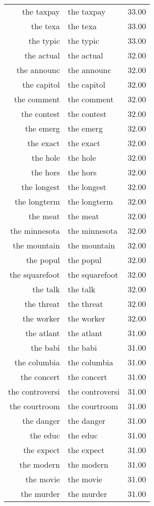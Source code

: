 \begin{table}[ht]
\begin{tabular}{rlr}
  the taxpay & the taxpay & 33.00 \\ 
  the texa & the texa & 33.00 \\ 
  the typic & the typic & 33.00 \\ 
  the actual & the actual & 32.00 \\ 
  the announc & the announc & 32.00 \\ 
  the capitol & the capitol & 32.00 \\ 
  the comment & the comment & 32.00 \\ 
  the contest & the contest & 32.00 \\ 
  the emerg & the emerg & 32.00 \\ 
  the exact & the exact & 32.00 \\ 
  the hole & the hole & 32.00 \\ 
  the hors & the hors & 32.00 \\ 
  the longest & the longest & 32.00 \\ 
  the longterm & the longterm & 32.00 \\ 
  the meat & the meat & 32.00 \\ 
  the minnesota & the minnesota & 32.00 \\ 
  the mountain & the mountain & 32.00 \\ 
  the popul & the popul & 32.00 \\ 
  the squarefoot & the squarefoot & 32.00 \\ 
  the talk & the talk & 32.00 \\ 
  the threat & the threat & 32.00 \\ 
  the worker & the worker & 32.00 \\ 
  the atlant & the atlant & 31.00 \\ 
  the babi & the babi & 31.00 \\ 
  the columbia & the columbia & 31.00 \\ 
  the concert & the concert & 31.00 \\ 
  the controversi & the controversi & 31.00 \\ 
  the courtroom & the courtroom & 31.00 \\ 
  the danger & the danger & 31.00 \\ 
  the educ & the educ & 31.00 \\ 
  the expect & the expect & 31.00 \\ 
  the modern & the modern & 31.00 \\ 
  the movie & the movie & 31.00 \\ 
  the murder & the murder & 31.00 \\ 

\end{tabular}
\end{table}

